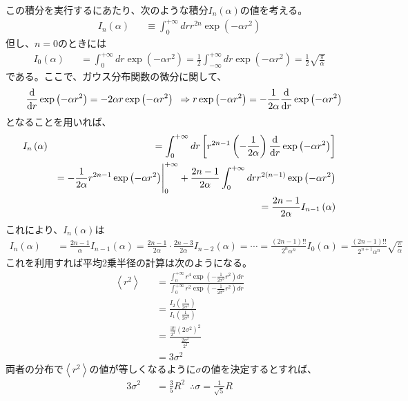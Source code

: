 \documentclass[a4j,fleqn]{jsarticle}
\begin{document}
        この積分を実行するにあたり、次のような積分$I_n\left(\alpha\right)$の値を考える。
        \begin{eqnarray}
            I_n\left(\alpha\right)&&\equiv\int_{0}^{+\infty}{dr{r^{2n}\exp{\left(-\alpha{r^2}\right)}}}
        \end{eqnarray}
        但し、$n=0$のときには
        \begin{eqnarray}
            I_0\left(\alpha\right)&&=\int_{0}^{+\infty}{dr{\exp{\left(-\alpha{r^2}\right)}}}=\frac{1}{2}\int_{-\infty}^{+\infty}{dr{\exp{\left(-\alpha{r^2}\right)}}}=\frac{1}{2}\sqrt{\frac{\pi}{\alpha}}
        \end{eqnarray}
        である。ここで、ガウス分布関数の微分に関して、
        \begin{eqnarray}
            &&\frac{{\rm{d}}}{{\rm{d}}r}\exp{\left(-\alpha{r^2}\right)}=-2\alpha{r}\exp{\left(-\alpha{r^2}\right)}\,\,\,\Rightarrow{r}\exp{\left(-\alpha{r^2}\right)}=-\frac{1}{2\alpha}\frac{{\rm{d}}}{{\rm{d}}r}\exp{\left(-\alpha{r^2}\right)}
        \end{eqnarray}
        となることを用いれば、
        \begin{eqnarray}
            I_n\left(\alpha\right)&&=\int_{0}^{+\infty}{dr\left[r^{2n-1}\left(-\frac{1}{2\alpha}\right)\frac{{\rm{d}}}{{\rm{d}}r}\exp{\left(-\alpha{r^2}\right)}\right]}\\
            &&=-\frac{1}{2\alpha}r^{2n-1}\exp{\left(-\alpha{r^2}\right)}\Bigg|_{0}^{+\infty}+\frac{2n-1}{2\alpha}\int_{0}^{+\infty}{dr{r^{2\left(n-1\right)}\exp{\left(-\alpha{r^2}\right)}}}\\
            &&=\frac{2n-1}{2\alpha}I_{n-1}\left(\alpha\right)
        \end{eqnarray}
        これにより、$I_n\left(\alpha\right)$は
        \begin{eqnarray}
            I_n\left(\alpha\right)&&=\frac{2n-1}{\alpha}I_{n-1}\left(\alpha\right)=\frac{2n-1}{2\alpha}\cdot\frac{2n-3}{2\alpha}I_{n-2}\left(\alpha\right)=\cdots=\frac{\left(2n-1\right)!!}{2^n\alpha^n}I_0\left(\alpha\right)=\frac{\left(2n-1\right)!!}{2^{n+1}\alpha^n}\sqrt{\frac{\pi}{\alpha}}
        \end{eqnarray}
        これを利用すれば平均2乗半径の計算は次のようになる。
        \begin{eqnarray}
            \left<r^2\right>&&=\frac{\int_{0}^{+\infty}{r^4\exp{\left(-\frac{1}{2\sigma^2}r^2\right)}dr}}{\int_{0}^{+\infty}{{r^2}\exp{\left(-\frac{1}{2\sigma^2}r^2\right)}dr}}\\
            &&=\frac{I_{2}\left(\frac{1}{2\sigma^2}\right)}{I_{1}\left(\frac{1}{2\sigma^2}\right)}\\
            &&=\frac{\frac{3!!}{2^3}\left(2\sigma^2\right)^2}{\frac{2\sigma^2}{2^2}}\\
            &&=3\sigma^2
        \end{eqnarray}
        両者の分布で$\left<r^2\right>$の値が等しくなるように$\sigma$の値を決定するとすれば、
        \begin{eqnarray}
            3\sigma^2&&=\frac{3}{5}R^2\,\,\,\therefore\sigma=\frac{1}{\sqrt{5}}R
        \end{eqnarray}
\end{document}
